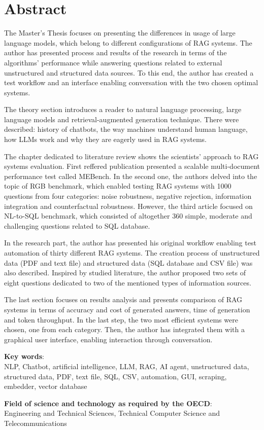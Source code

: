 \chapter*{Abstract}

The Master's Thesis focuses on presenting the differences in usage of large language models, which belong to different configurations of RAG systems. The author has presented process and results of the research in terms of the algorithms' performance while answering questions related to external unstructured and structured data sources. To this end, the author has created a test workflow and an interface enabling conversation with the two chosen optimal systems.

The theory section introduces a reader to natural language processing, large language models and retrieval-augmented generation technique. There were described: history of chatbots, the way machines understand human language, how LLMs work and why they are eagerly used in RAG systems.

The chapter dedicated to literature review shows the scientists' approach to RAG systems evaluation. First reffered publication presented a scalable multi-document performance test called MEBench. In the second one, the authors delved into the topic of RGB benchmark, which enabled testing RAG systems with 1000 questions from four categories: noise robustness, negative rejection, information integration and counterfactual robustness. However, the third article focused on NL-to-SQL benchmark, which consisted of altogether 360 simple, moderate and challenging questions related to SQL database.

In the research part, the author has presented his original workflow enabling test automation of thirty different RAG systems. The creation process of unstructured data (PDF and text file) and structured data (SQL database and CSV file) was also described. Inspired by studied literature, the author proposed two sets of eight questions dedicated to two of the mentioned types of information sources.

The last section focuses on results analysis and presents comparison of RAG systems in terms of accuracy and cost of generated answers, time of generation and token throughput. In the last step, the two most efficient systems were chosen, one from each category. Then, the author has integrated them with a graphical user interface, enabling interaction through conversation.



\bigskip
\bigskip

\noindent \textbf{Key words}: \\
NLP, Chatbot, artificial intelligence, LLM, RAG, AI agent, unstructured data, structured data, PDF, text file, SQL, CSV, automation, GUI, scraping, embedder, vector database


\bigskip

\noindent \textbf{Field of science and technology as required by the OECD}: \\
Engineering and Technical Sciences, Technical Computer Science and Telecommunications